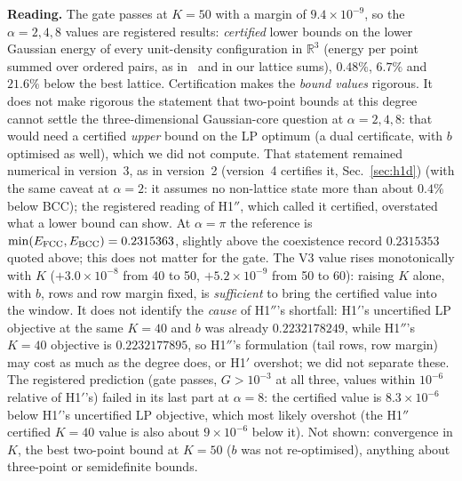 \textbf{Reading.} The gate passes at $K=50$ with a margin of $9.4\times10^{-9}$, so the $\alpha=2,4,8$ values are registered
results: \emph{certified} lower bounds on the lower Gaussian energy of every unit-density configuration in $\mathbb R^3$ (energy
per point summed over ordered pairs, as in~\cite[Def.~1.1]{CdCI16} and in our lattice sums), $0.48\%$, $6.7\%$ and $21.6\%$
below the best lattice. Certification makes the \emph{bound values} rigorous. It does not make rigorous the statement that
two-point bounds at this degree cannot settle the three-dimensional Gaussian-core question at $\alpha=2,4,8$: that would need
a certified \emph{upper} bound on the LP optimum (a dual certificate, with $b$ optimised as well), which we did not compute. That
statement remained numerical in version~3, as in version~2 (version~4 certifies it, Sec.~\ref{sec:h1d}) (with the same caveat at $\alpha=2$: it assumes no non-lattice state more than about
$0.4\%$ below BCC); the registered reading of H1$''$, which called it certified, overstated what a lower bound can show. At
$\alpha=\pi$ the reference is $\min(E_{\rm FCC},E_{\rm BCC})=0.2315363$, slightly above the coexistence record $0.2315353$ quoted
above; this does not matter for the gate. The V3 value rises monotonically with $K$ ($+3.0\times10^{-8}$ from 40 to 50,
$+5.2\times10^{-9}$ from 50 to 60): raising $K$ alone, with $b$, rows and row margin fixed, is \emph{sufficient} to bring the
certified value into the window. It does not identify the \emph{cause} of H1$''$'s shortfall: H1$'$'s uncertified LP objective at
the same $K=40$ and $b$ was already $0.2232178249$, while H1$''$'s $K=40$ objective is $0.2232177895$, so H1$''$'s formulation
(tail rows, row margin) may cost as much as the degree does, or H1$'$ overshot; we did not separate these. The registered
prediction (gate passes, $G>10^{-3}$ at all three, values within $10^{-6}$ relative of H1$'$'s) failed in its last part at
$\alpha=8$: the certified value is $8.3\times10^{-6}$ below H1$'$'s uncertified LP objective, which most likely overshot (the
H1$''$ certified $K=40$ value is also about $9\times10^{-6}$ below it). Not shown: convergence in $K$, the best two-point bound
at $K=50$ ($b$ was not re-optimised), anything about three-point or semidefinite bounds.
